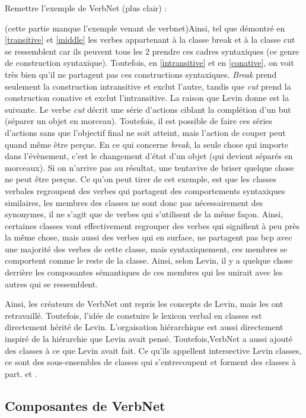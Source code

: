 Remettre l'exemple de VerbNet (plus clair) :

(cette partie manque l'exemple venant de verbnet)Ainsi, tel que démontré en \ref{transitive} et \ref{middle} les verbes appartenant à la classe break et à la classe cut se ressemblent car ils peuvent tous les 2 prendre ces cadres syntaxiques (ce genre de construction syntaxique). Toutefois, en \ref{intransitive} et en \ref{conative}, on voit très bien qu'il ne partagent pas ces constructions syntaxiques. \emph{Break} prend seulement la construction intransitive et exclut l'autre, tandis que \emph{cut} prend la construction conative et exclut l'intransitive. La raison que Levin donne est la suivante. Le verbe \emph{cut} décrit une série d'actions ciblant la complétion d'un but (séparer un objet en morceau). Toutefois, il est possible de faire ces séries d'actions sans que l'objectif final ne soit atteint, mais l'action de couper peut quand même être perçue. En ce qui concerne \emph{break}, la seule chose qui importe dans l'évènement, c'est le changement d'état d'un objet (qui devient séparés en morceaux). Si on n'arrive pas au résultat, une tentavive de briser quelque chose ne peut être perçue. Ce qu'on peut tirer de cet exemple, est que les classes verbales regroupent des verbes qui partagent des comportements syntaxiques similaires, les membres des classes ne sont donc pas nécessairement des synonymes, il ne s'agit que de verbes qui s'utilisent de la même façon. Ainsi, certaines classes vont effectivement regrouper des verbes qui signifient à peu près la même chose, mais aussi des verbes qui en surface, ne partagent pas bcp avec une majorité des verbes de cette classe, mais syntaxiquement, ces membres se comportent comme le reste de la classe. Ainsi, selon Levin, il y a quelque chose derrière les composantes sémantiques de ces membres qui les unirait avec les autres qui se ressemblent.

Ainsi, les créateurs de VerbNet ont repris les concepts de Levin, mais les ont retravaillé. Toutefois, l'idée de constuire le lexicon verbal en classes est directement hérité de Levin.  L'orgaisation hiérarchique est aussi directement inspiré de la hiérarchie que Levin avait pensé. Toutefois,VerbNet a aussi ajouté des classes à ce que Levin avait fait. Ce qu'ils appellent intersective Levin classes, ce sont des sous-ensembles de classes qui s'entrecoupent et forment des classes à part. \citep{SchulerVerbnetBroadcoverageComprehensive2005}et \citep{verbnet.2006}.

\subsection {Composantes de VerbNet}  

